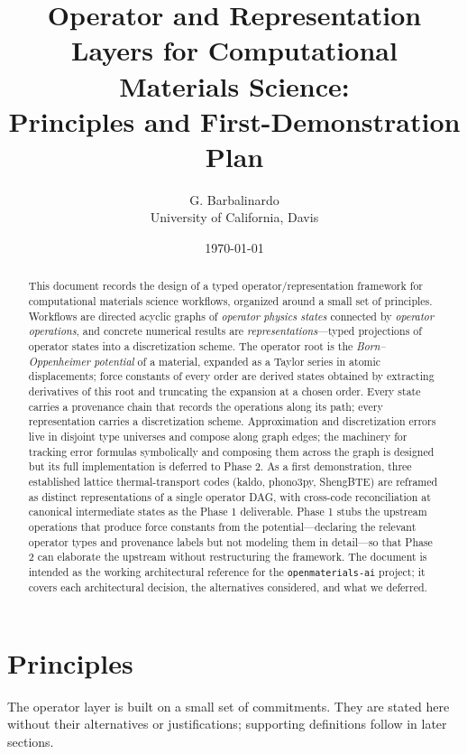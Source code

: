 \documentclass[11pt,a4paper]{article}
\title{Operator and Representation Layers for Computational Materials Science:\\
       Principles and First-Demonstration Plan}
\author{G. Barbalinardo \\
        \small University of California, Davis}
\date{\today}
\begin{document}
\maketitle

\begin{abstract}
This document records the design of a typed operator/representation framework for computational materials science
workflows, organized around a small set of principles. Workflows are directed
acyclic graphs of \emph{operator physics states} connected by \emph{operator operations}, and
concrete numerical results are \emph{representations}---typed projections of operator states
into a discretization scheme. The operator root is the \emph{Born--Oppenheimer
potential} of a material, expanded as a Taylor series in atomic displacements; force constants
of every order are derived states obtained by extracting derivatives of this root and truncating
the expansion at a chosen order. Every state carries a provenance chain that records the
operations along its path; every representation carries a discretization scheme. Approximation
and discretization errors live in disjoint type universes and compose along graph edges; the
machinery for tracking error formulas symbolically and composing them across the graph is
designed but its full implementation is deferred to Phase 2. As a first demonstration, three
established lattice thermal-transport codes (kaldo, phono3py, ShengBTE) are reframed as distinct
representations of a single operator DAG, with cross-code reconciliation at canonical
intermediate states as the Phase 1 deliverable. Phase 1 stubs the upstream operations that
produce force constants from the potential---declaring the relevant operator types and provenance
labels but not modeling them in detail---so that Phase 2 can elaborate the upstream without
restructuring the framework. The document is intended as the working architectural reference for
the \texttt{openmaterials-ai} project; it covers each architectural decision, the alternatives
considered, and what we deferred.
\end{abstract}

\tableofcontents

\bigskip

\section{Principles}
\label{sec:principles}

The operator layer is built on a small set of commitments. They are stated here without
their alternatives or justifications; supporting definitions follow in later sections.
\end{document}
